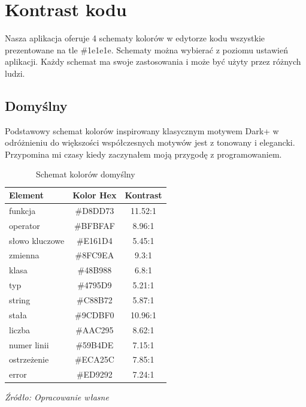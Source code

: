 \section{Kontrast kodu}
\label{sec:code_color}
Nasza aplikacja oferuje 4 schematy kolorów w edytorze kodu wszystkie prezentowane na tle \#1e1e1e. Schematy można wybierać z poziomu ustawień aplikacji. Każdy schemat ma swoje zastosowania i może być użyty przez różnych ludzi.
\subsection{Domyślny}
Podstawowy schemat kolorów inspirowany klasycznym motywem Dark+ w odróżnieniu do większości współczesnych motywów jest z tonowany i elegancki. Przypomina mi czasy kiedy zaczynałem moją przygodę z programowaniem.

\begin{table}[ht]
\centering
\caption{Schemat kolorów domyślny}
\label{tab:default}
\begin{tabular}{|>{\raggedright\arraybackslash}p{4cm}|c|c|}
\hline
\textbf{Element} & \textbf{Kolor Hex} & \textbf{Kontrast} \\
\hline
funkcja       & \#D8DD73 & 11.52:1 \\
operator      & \#BFBFAF & 8.96:1 \\
słowo kluczowe & \#E161D4 & 5.45:1 \\
zmienna       & \#8FC9EA & 9.3:1 \\
klasa         & \#48B988 & 6.8:1 \\
typ           & \#4795D9 & 5.21:1 \\
string        & \#C88B72 & 5.87:1 \\
stała         & \#9CDBF0 & 10.96:1 \\
liczba        & \#AAC295 & 8.62:1 \\
numer linii   & \#59B4DE & 7.15:1 \\
\hline
ostrzeżenie   & \#ECA25C & 7.85:1 \\
error         & \#ED9292 & 7.24:1 \\
\hline
\end{tabular}
\newline\newline
{\raggedright\fontsize{10pt}{12pt}\selectfont\textit{Źródło: Opracowanie własne}\par}
\end{table}

